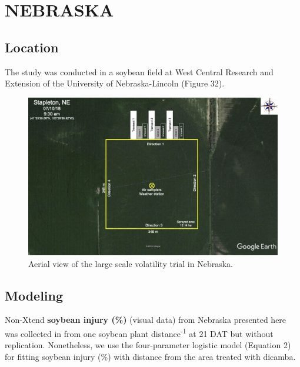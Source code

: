 \documentclass[]{article}
\begin{document}
\newpage

\pagebreak

\section{NEBRASKA}\label{nebraska-1}

\subsection{Location}\label{location-3}

The study was conducted in a soybean field at West Central Research and
Extension of the University of Nebraska-Lincoln (Figure 32).

\begin{figure}[h]

{\centering \includegraphics[width=1\linewidth]{nebraska} 

}

\caption{Aerial view of the large scale volatility trial in Nebraska.}\label{fig:unnamed-chunk-67}
\end{figure}

\pagebreak
\newpage

\subsection{Modeling}\label{modeling-3}

Non-Xtend \textbf{soybean injury (\%)} (visual data) from Nebraska
presented here was collected in from one soybean plant
distance\textsuperscript{-1} at 21 DAT but without replication.
Nonetheless, we use the four-parameter logistic model (Equation 2) for
fitting soybean injury (\%) with distance from the area treated with
dicamba.
\end{document}
